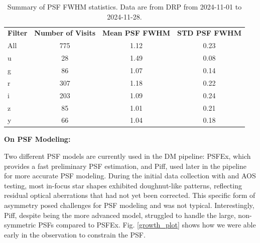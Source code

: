 \begin{table}
\centering
\begin{tabular}{@{}lccc@{}}
\textbf{Filter} & \textbf{Number of Visits} & \textbf{Mean PSF FWHM} & \textbf{STD PSF FWHM} \\ 
All           & 775                      & 1.12                   & 0.23                  \\
u             & 28                       & 1.49                   & 0.08                  \\
g             & 86                       & 1.07                   & 0.14                  \\
r             & 307                      & 1.18                   & 0.22                  \\
i             & 203                      & 1.09                   & 0.24                  \\
z             & 85                       & 1.01                   & 0.21                  \\
y             & 66                       & 1.04                   & 0.18                  \\ 
\end{tabular}
\caption{Summary of PSF FWHM statistics. Data are from DRP from 2024-11-01 to 2024-11-28.}
\label{tab:psf_summary}
\end{table}


\textbf{On PSF Modeling:}

Two different PSF models are currently used in the DM pipeline: PSFEx, which provides a fast preliminary PSF estimation, and Piff, used later in the pipeline for more accurate PSF modeling. During the initial data collection with \ComCam and AOS testing, most in-focus star shapes exhibited doughnut-like patterns, reflecting residual optical aberrations that had not yet been corrected. This specific form of asymmetry posed challenges for PSF modeling and was not typical. Interestingly, Piff, despite being the more advanced model, struggled to handle the large, non-symmetric PSFs compared to PSFEx. Fig. \ref{growth_plot} shows how we were able early in the observation to constrain the PSF.


